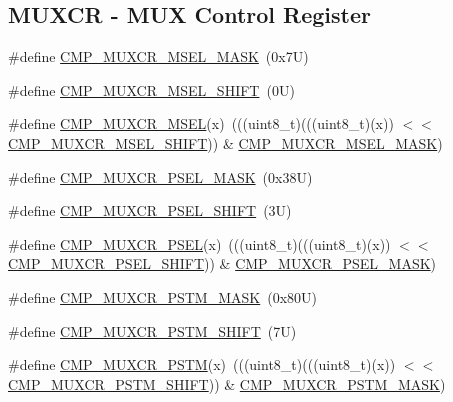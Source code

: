 \subsection*{M\+U\+X\+CR -\/ M\+UX Control Register}
\begin{DoxyCompactItemize}
\item 
\#define \mbox{\hyperlink{group___c_m_p___register___masks_ga6ff83366097d3be5ae93234b68684cf5}{C\+M\+P\+\_\+\+M\+U\+X\+C\+R\+\_\+\+M\+S\+E\+L\+\_\+\+M\+A\+SK}}~(0x7\+U)
\item 
\#define \mbox{\hyperlink{group___c_m_p___register___masks_gad74d8206afe9b7ad009b0a7ac2bbf1cf}{C\+M\+P\+\_\+\+M\+U\+X\+C\+R\+\_\+\+M\+S\+E\+L\+\_\+\+S\+H\+I\+FT}}~(0\+U)
\item 
\#define \mbox{\hyperlink{group___c_m_p___register___masks_ga31028e9db6d77502d4561380ce1b12fe}{C\+M\+P\+\_\+\+M\+U\+X\+C\+R\+\_\+\+M\+S\+EL}}(x)~(((uint8\+\_\+t)(((uint8\+\_\+t)(x)) $<$$<$ \mbox{\hyperlink{group___c_m_p___register___masks_gad74d8206afe9b7ad009b0a7ac2bbf1cf}{C\+M\+P\+\_\+\+M\+U\+X\+C\+R\+\_\+\+M\+S\+E\+L\+\_\+\+S\+H\+I\+FT}})) \& \mbox{\hyperlink{group___c_m_p___register___masks_ga6ff83366097d3be5ae93234b68684cf5}{C\+M\+P\+\_\+\+M\+U\+X\+C\+R\+\_\+\+M\+S\+E\+L\+\_\+\+M\+A\+SK}})
\item 
\#define \mbox{\hyperlink{group___c_m_p___register___masks_gaba9739da107b2a2b908af338d14df160}{C\+M\+P\+\_\+\+M\+U\+X\+C\+R\+\_\+\+P\+S\+E\+L\+\_\+\+M\+A\+SK}}~(0x38\+U)
\item 
\#define \mbox{\hyperlink{group___c_m_p___register___masks_gab686629f56ced4b88c699f0f610dece5}{C\+M\+P\+\_\+\+M\+U\+X\+C\+R\+\_\+\+P\+S\+E\+L\+\_\+\+S\+H\+I\+FT}}~(3\+U)
\item 
\#define \mbox{\hyperlink{group___c_m_p___register___masks_ga23ea598b890c708e1748b52475f92f50}{C\+M\+P\+\_\+\+M\+U\+X\+C\+R\+\_\+\+P\+S\+EL}}(x)~(((uint8\+\_\+t)(((uint8\+\_\+t)(x)) $<$$<$ \mbox{\hyperlink{group___c_m_p___register___masks_gab686629f56ced4b88c699f0f610dece5}{C\+M\+P\+\_\+\+M\+U\+X\+C\+R\+\_\+\+P\+S\+E\+L\+\_\+\+S\+H\+I\+FT}})) \& \mbox{\hyperlink{group___c_m_p___register___masks_gaba9739da107b2a2b908af338d14df160}{C\+M\+P\+\_\+\+M\+U\+X\+C\+R\+\_\+\+P\+S\+E\+L\+\_\+\+M\+A\+SK}})
\item 
\#define \mbox{\hyperlink{group___c_m_p___register___masks_ga5636686e652e5c89b119ff1954c0e98a}{C\+M\+P\+\_\+\+M\+U\+X\+C\+R\+\_\+\+P\+S\+T\+M\+\_\+\+M\+A\+SK}}~(0x80\+U)
\item 
\#define \mbox{\hyperlink{group___c_m_p___register___masks_gafd77773e4a14b8f22b0b00c52a180d0c}{C\+M\+P\+\_\+\+M\+U\+X\+C\+R\+\_\+\+P\+S\+T\+M\+\_\+\+S\+H\+I\+FT}}~(7\+U)
\item 
\#define \mbox{\hyperlink{group___c_m_p___register___masks_ga062f6f254d40b3086bef0c64058f3db4}{C\+M\+P\+\_\+\+M\+U\+X\+C\+R\+\_\+\+P\+S\+TM}}(x)~(((uint8\+\_\+t)(((uint8\+\_\+t)(x)) $<$$<$ \mbox{\hyperlink{group___c_m_p___register___masks_gafd77773e4a14b8f22b0b00c52a180d0c}{C\+M\+P\+\_\+\+M\+U\+X\+C\+R\+\_\+\+P\+S\+T\+M\+\_\+\+S\+H\+I\+FT}})) \& \mbox{\hyperlink{group___c_m_p___register___masks_ga5636686e652e5c89b119ff1954c0e98a}{C\+M\+P\+\_\+\+M\+U\+X\+C\+R\+\_\+\+P\+S\+T\+M\+\_\+\+M\+A\+SK}})
\end{DoxyCompactItemize}


